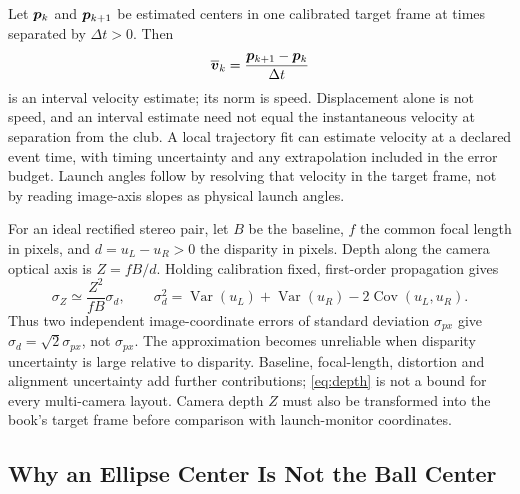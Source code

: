 Let $\bm{p}_k$ and $\bm{p}_{k+1}$ be estimated centers in one calibrated target frame at times separated by $\Delta t>0$.
Then
\begin{equation}
\overline{\bm{v}}_k=\frac{\bm{p}_{k+1}-\bm{p}_k}{\Delta t}
\end{equation}
is an interval velocity estimate; its norm is speed.
Displacement alone is not speed, and an interval estimate need not equal the instantaneous velocity at separation from the club.
A local trajectory fit can estimate velocity at a declared event time, with timing uncertainty and any extrapolation included in the error budget.
Launch angles follow by resolving that velocity in the target frame, not by reading image-axis slopes as physical launch angles.

For an ideal rectified stereo pair, let $B$ be the baseline, $f$ the common focal length in pixels, and $d=u_L-u_R>0$ the disparity in pixels.
Depth along the camera optical axis is $Z=fB/d$.
Holding calibration fixed, first-order propagation gives
\begin{equation}
\label{eq:depth}
\sigma_Z\simeq\frac{Z^2}{fB}\sigma_d,
\qquad
\sigma_d^2=\operatorname{Var}(u_L)+\operatorname{Var}(u_R)
-2\operatorname{Cov}(u_L,u_R).
\end{equation}
Thus two independent image-coordinate errors of standard deviation $\sigma_{px}$ give $\sigma_d=\sqrt{2}\sigma_{px}$, not $\sigma_{px}$.
The approximation becomes unreliable when disparity uncertainty is large relative to disparity.
Baseline, focal-length, distortion and alignment uncertainty add further contributions; \cref{eq:depth} is not a bound for every multi-camera layout.
Camera depth $Z$ must also be transformed into the book's target frame before comparison with launch-monitor coordinates.

\subsection{Why an Ellipse Center Is Not the Ball Center}

